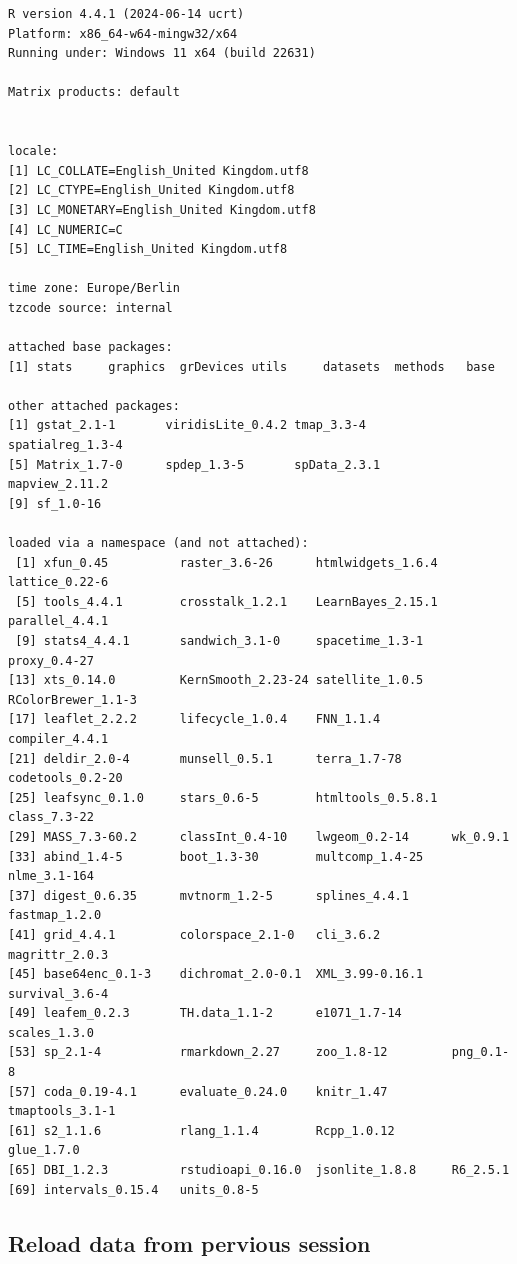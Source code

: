 \documentclass[
  letterpaper,
  DIV=11,
  numbers=noendperiod]{scrreprt}
\begin{document}
\begin{verbatim}
R version 4.4.1 (2024-06-14 ucrt)
Platform: x86_64-w64-mingw32/x64
Running under: Windows 11 x64 (build 22631)

Matrix products: default


locale:
[1] LC_COLLATE=English_United Kingdom.utf8 
[2] LC_CTYPE=English_United Kingdom.utf8   
[3] LC_MONETARY=English_United Kingdom.utf8
[4] LC_NUMERIC=C                           
[5] LC_TIME=English_United Kingdom.utf8    

time zone: Europe/Berlin
tzcode source: internal

attached base packages:
[1] stats     graphics  grDevices utils     datasets  methods   base     

other attached packages:
[1] gstat_2.1-1       viridisLite_0.4.2 tmap_3.3-4        spatialreg_1.3-4 
[5] Matrix_1.7-0      spdep_1.3-5       spData_2.3.1      mapview_2.11.2   
[9] sf_1.0-16        

loaded via a namespace (and not attached):
 [1] xfun_0.45          raster_3.6-26      htmlwidgets_1.6.4  lattice_0.22-6    
 [5] tools_4.4.1        crosstalk_1.2.1    LearnBayes_2.15.1  parallel_4.4.1    
 [9] stats4_4.4.1       sandwich_3.1-0     spacetime_1.3-1    proxy_0.4-27      
[13] xts_0.14.0         KernSmooth_2.23-24 satellite_1.0.5    RColorBrewer_1.1-3
[17] leaflet_2.2.2      lifecycle_1.0.4    FNN_1.1.4          compiler_4.4.1    
[21] deldir_2.0-4       munsell_0.5.1      terra_1.7-78       codetools_0.2-20  
[25] leafsync_0.1.0     stars_0.6-5        htmltools_0.5.8.1  class_7.3-22      
[29] MASS_7.3-60.2      classInt_0.4-10    lwgeom_0.2-14      wk_0.9.1          
[33] abind_1.4-5        boot_1.3-30        multcomp_1.4-25    nlme_3.1-164      
[37] digest_0.6.35      mvtnorm_1.2-5      splines_4.4.1      fastmap_1.2.0     
[41] grid_4.4.1         colorspace_2.1-0   cli_3.6.2          magrittr_2.0.3    
[45] base64enc_0.1-3    dichromat_2.0-0.1  XML_3.99-0.16.1    survival_3.6-4    
[49] leafem_0.2.3       TH.data_1.1-2      e1071_1.7-14       scales_1.3.0      
[53] sp_2.1-4           rmarkdown_2.27     zoo_1.8-12         png_0.1-8         
[57] coda_0.19-4.1      evaluate_0.24.0    knitr_1.47         tmaptools_3.1-1   
[61] s2_1.1.6           rlang_1.1.4        Rcpp_1.0.12        glue_1.7.0        
[65] DBI_1.2.3          rstudioapi_0.16.0  jsonlite_1.8.8     R6_2.5.1          
[69] intervals_0.15.4   units_0.8-5       
\end{verbatim}

\hypertarget{reload-data-from-pervious-session-3}{%
\subsection*{Reload data from pervious
session}\label{reload-data-from-pervious-session-3}}
\end{document}
